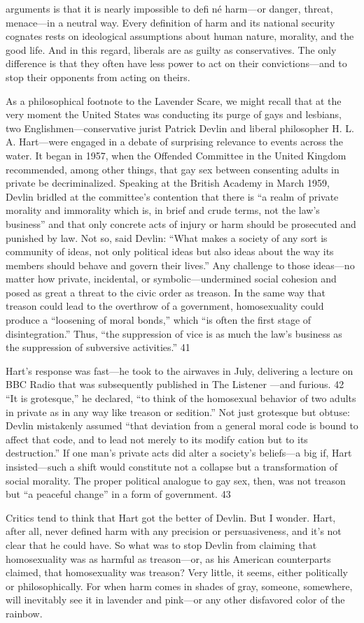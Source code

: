 arguments is that it is nearly impossible to defi né harm—or danger, threat, menace—in a neutral way. Every definition of harm and its national security cognates rests on ideological assumptions about human nature, morality, and the good life. And in this regard, liberals are as guilty as conservatives. The only difference is that they often have less power to act on their convictions—and to stop their opponents from acting on theirs.{\par} As a philosophical footnote to the Lavender Scare, we might recall that at the very moment the United States was conducting its purge of gays and lesbians, two Englishmen—conservative jurist Patrick Devlin and liberal philosopher H. L. A. Hart—were engaged in a debate of surprising relevance to events across the water. It began in 1957, when the Offended Committee in the United Kingdom recommended, among other things, that gay sex between consenting adults in private be decriminalized. Speaking at the British Academy in March 1959, Devlin bridled at the committee’s contention that there is “a realm of private morality and immorality which is, in brief and crude terms, not the law’s business” and that only concrete acts of injury or harm should be prosecuted and punished by law. Not so, said Devlin: “What makes a society of any sort is community of ideas, not only political ideas but also ideas about the way its members should behave and govern their lives.” Any challenge to those ideas—no matter how private, incidental, or symbolic—undermined social cohesion and posed as great a threat to the civic order as treason. In the same way that treason could lead to the overthrow of a government, homosexuality could produce a “loosening of moral bonds,” which “is often the first stage of disintegration.” Thus, “the suppression of vice is as much the law’s business as the suppression of subversive activities.” {\color{blue} 41 } {\par} Hart’s response was fast—he took to the airwaves in July, delivering a lecture on BBC Radio that was subsequently published in The Listener —and furious. {\color{blue} 42 } “It is grotesque,” he declared, “to think of the homosexual behavior of two adults in private as in any way like treason or sedition.” Not just grotesque but obtuse: Devlin mistakenly assumed “that deviation from a general moral code is bound to affect that code, and to lead not merely to its modify cation but to its destruction.” If one man’s private acts did alter a society’s beliefs—a big if, Hart insisted—such a shift would constitute not a collapse but a transformation of social morality. The proper political analogue to gay sex, then, was not treason but “a peaceful change” in a form of government. {\color{blue} 43 } {\par} Critics tend to think that Hart got the better of Devlin. But I wonder. Hart, after all, never defined harm with any precision or persuasiveness, and it’s not clear that he could have. So what was to stop Devlin from claiming that homosexuality was as harmful as treason—or, as his American counterparts claimed, that homosexuality was treason? Very little, it seems, either politically or philosophically. For when harm comes in shades of gray, someone, somewhere, will inevitably see it in lavender and pink—or any other disfavored color of the rainbow.{\par}